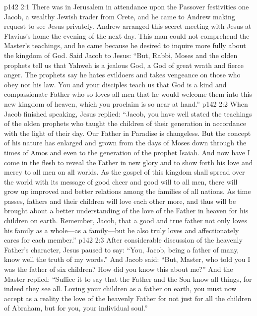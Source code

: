 \vs p142 2:1 There was in Jerusalem in attendance upon the Passover festivities one Jacob, a wealthy Jewish trader from Crete, and he came to Andrew making request to see Jesus privately. Andrew arranged this secret meeting with Jesus at Flavius’s home the evening of the next day. This man could not comprehend the Master’s teachings, and he came because he desired to inquire more fully about the kingdom of God. Said Jacob to Jesus: “But, Rabbi, Moses and the olden prophets tell us that Yahweh is a jealous God, a God of great wrath and fierce anger. The prophets say he hates evildoers and takes vengeance on those who obey not his law. You and your disciples teach us that God is a kind and compassionate Father who so loves all men that he would welcome them into this new kingdom of heaven, which you proclaim is so near at hand.”
\pc \vs p142 2:2 When Jacob finished speaking, Jesus replied: \textcolor{ubdarkred}{“Jacob, you have well stated the teachings of the olden prophets who taught the children of their generation in accordance with the light of their day. Our Father in Paradise is changeless. But the concept of his nature has enlarged and grown from the days of Moses down through the times of Amos and even to the generation of the prophet Isaiah. And now have I come in the flesh to reveal the Father in new glory and to show forth his love and mercy to all men on all worlds. As the gospel of this kingdom shall spread over the world with its message of good cheer and good will to all men, there will grow up improved and better relations among the families of all nations. As time passes, fathers and their children will love each other more, and thus will be brought about a better understanding of the love of the Father in heaven for his children on earth. Remember, Jacob, that a good and true father not only loves his family as a whole---as a family---but he also truly loves and affectionately cares for each  member.”}
\vs p142 2:3 After considerable discussion of the heavenly Father’s character, Jesus paused to say: \textcolor{ubdarkred}{“You, Jacob, being a father of many, know well the truth of my words.”} And Jacob said: “But, Master, who told you I was the father of six children? How did you know this about me?” And the Master replied: \textcolor{ubdarkred}{“Suffice it to say that the Father and the Son know all things, for indeed they see all. Loving your children as a father on earth, you must now accept as a reality the love of the heavenly Father for not just for all the children of Abraham, but for you, your individual soul.”}
